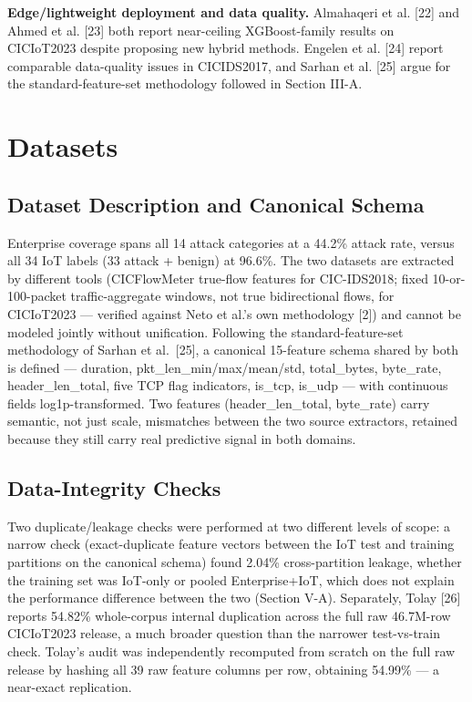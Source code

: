 \documentclass[conference]{IEEEtran}
\begin{document}
\textbf{Edge/lightweight deployment and data quality.} Almahaqeri et al. [22] and Ahmed et al. [23] both report near-ceiling XGBoost-family results on CICIoT2023 despite proposing new hybrid methods. Engelen et al. [24] report comparable data-quality issues in CICIDS2017, and Sarhan et al. [25] argue for the standard-feature-set methodology followed in Section III-A.

\section{Datasets}

\subsection{Dataset Description and Canonical Schema}

Enterprise coverage spans all 14 attack categories at a 44.2\% attack rate, versus all 34 IoT labels (33 attack + benign) at 96.6\%. The two datasets are extracted by different tools (CICFlowMeter true-flow features for CIC-IDS2018; fixed 10-or-100-packet traffic-aggregate windows, not true bidirectional flows, for CICIoT2023 --- verified against Neto et al.'s own methodology [2]) and cannot be modeled jointly without unification. Following the standard-feature-set methodology of Sarhan et al.~[25], a canonical 15-feature schema shared by both is defined --- duration, pkt\_len\_min/max/mean/std, total\_bytes, byte\_rate, header\_len\_total, five TCP flag indicators, is\_tcp, is\_udp --- with continuous fields log1p-transformed. Two features (header\_len\_total, byte\_rate) carry semantic, not just scale, mismatches between the two source extractors, retained because they still carry real predictive signal in both domains.

\subsection{Data-Integrity Checks}

Two duplicate/leakage checks were performed at two different levels of scope: a narrow check (exact-duplicate feature vectors between the IoT test and training partitions on the canonical schema) found 2.04\% cross-partition leakage, whether the training set was IoT-only or pooled Enterprise+IoT, which does not explain the performance difference between the two (Section V-A). Separately, Tolay [26] reports 54.82\% whole-corpus internal duplication across the full raw 46.7M-row CICIoT2023 release, a much broader question than the narrower test-vs-train check. Tolay's audit was independently recomputed from scratch on the full raw release by hashing all 39 raw feature columns per row, obtaining 54.99\% --- a near-exact replication.
\end{document}
